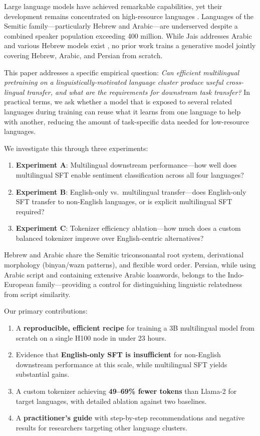 \documentclass[10pt,twocolumn]{article}
\begin{document}
Large language models have achieved remarkable capabilities, yet their development remains concentrated on high-resource languages \citep{joshi2020state}. Languages of the Semitic family---particularly Hebrew and Arabic---are underserved despite a combined speaker population exceeding 400 million. While Jais \citep{sengupta2023jais} addresses Arabic and various Hebrew models exist \citep{slasky2026hebrew}, no prior work trains a generative model jointly covering Hebrew, Arabic, and Persian from scratch.

This paper addresses a specific empirical question: \emph{Can efficient multilingual pretraining on a linguistically-motivated language cluster produce useful cross-lingual transfer, and what are the requirements for downstream task transfer?} In practical terms, we ask whether a model that is exposed to several related languages during training can reuse what it learns from one language to help with another, reducing the amount of task-specific data needed for low-resource languages.

We investigate this through three experiments:
\begin{enumerate}
    \item \textbf{Experiment A}: Multilingual downstream performance---how well does multilingual SFT enable sentiment classification across all four languages?
    \item \textbf{Experiment B}: English-only vs.\ multilingual transfer---does English-only SFT transfer to non-English languages, or is explicit multilingual SFT required?
    \item \textbf{Experiment C}: Tokenizer efficiency ablation---how much does a custom balanced tokenizer improve over English-centric alternatives?
\end{enumerate}

Hebrew and Arabic share the Semitic triconsonantal root system, derivational morphology (binyan/wazn patterns), and flexible word order. Persian, while using Arabic script and containing extensive Arabic loanwords, belongs to the Indo-European family---providing a control for distinguishing linguistic relatedness from script similarity.

Our primary contributions:
\begin{enumerate}
    \item A \textbf{reproducible, efficient recipe} for training a 3B multilingual model from scratch on a single H100 node in under 23 hours.
    \item Evidence that \textbf{English-only SFT is insufficient} for non-English downstream performance at this scale, while multilingual SFT yields substantial gains.
    \item A custom tokenizer achieving \textbf{49--69\% fewer tokens} than Llama-2 for target languages, with detailed ablation against two baselines.
    \item A \textbf{practitioner's guide} with step-by-step recommendations and negative results for researchers targeting other language clusters.
\end{enumerate}
\end{document}
